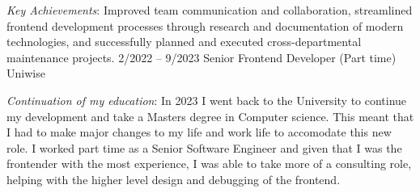 \documentclass[9pt]{developercv} %
\begin{document}
\begin{entrylist}
{			\textit{Key Achievements}: Improved team communication and collaboration, streamlined frontend development processes through research and documentation of modern technologies, and successfully planned and executed cross-departmental maintenance projects.
		}
		\entry
		{2/2022 -- 9/2023}
		{Senior Frontend Developer (\footnotesize{Part time})}
		{Uniwise}
		{

			\textit{Continuation of my education}: In 2023 I went back to the University to continue my development and take a Masters degree in Computer science. This meant that I had to make major changes to my life and work life to accomodate this new role.
			I worked part time as a Senior Software Engineer and given that I was the frontender with the most experience, I was able to take more of a consulting role, helping with the higher level design and debugging of the frontend.
		}
\end{entrylist}


\end{document}
